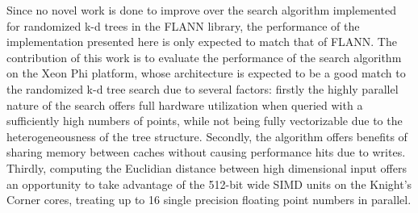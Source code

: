  Since no novel work is done to improve over the search algorithm implemented for randomized k-d trees in the FLANN library, the performance of the implementation presented here is only expected to match that of FLANN. The contribution of this work is to evaluate the performance of the search algorithm on the Xeon Phi platform, whose architecture is expected to be a good match to the randomized k-d tree search due to several factors: firstly the highly parallel nature of the search offers full
hardware utilization when queried with a sufficiently high numbers of points, while not being fully vectorizable due to the heterogeneousness of the tree structure. Secondly, the algorithm offers benefits of sharing memory between caches without causing performance hits due to writes. Thirdly, computing the Euclidian distance between high dimensional input offers an opportunity to take advantage of the 512-bit wide SIMD units on the Knight's Corner cores, treating up to 16
single precision floating point numbers in parallel. 


